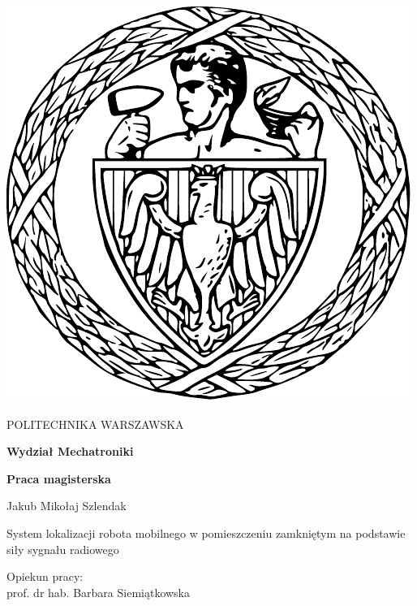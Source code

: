 
\thispagestyle {empty}

\begin{center}
	\includegraphics[scale=0.4]{img/pw}
	
	\vspace{0.5cm}
	
	{\fontsize{20}{20}\selectfont POLITECHNIKA WARSZAWSKA}
	
	\vspace{1.0cm}
	
	\textbf{{\fontsize{14}{14}\selectfont Wydział Mechatroniki}}
	
	\vspace{1.5cm}
	
	\textbf{{\fontsize{14}{14}\selectfont Praca magisterska}}

	\vspace{2.0cm}
	
	{\fontsize{14}{14}\selectfont Jakub Mikołaj Szlendak}
	
	\vspace{1cm}
	
	{\fontsize{28}{28}\selectfont System lokalizacji robota mobilnego w pomieszczeniu zamkniętym na podstawie siły sygnału radiowego}
	
	\vspace{1cm}
	\begin{flushright}
		{\fontsize{14}{14}\selectfont Opiekun pracy: \\ 
		prof. dr hab. Barbara Siemiątkowska}
	

\end{flushright}
\end{center}
